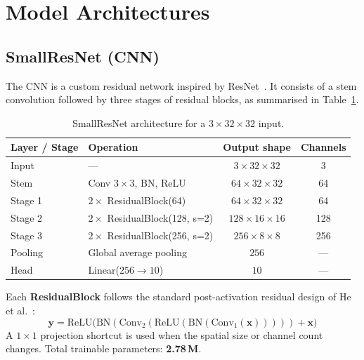 \documentclass[11pt,a4paper]{article}
\begin{document}
\section{Model Architectures}

\subsection{SmallResNet (CNN)}

The CNN is a custom residual network inspired by ResNet~\cite{he2016resnet}.
It consists of a stem convolution followed by three stages of residual blocks,
as summarised in Table~\ref{tab:cnn_arch}.

\begin{table}[H]
\centering
\caption{SmallResNet architecture for a $3\times32\times32$ input.}
\label{tab:cnn_arch}
\begin{tabular}{llcc}
\toprule
\textbf{Layer / Stage} & \textbf{Operation} & \textbf{Output shape} & \textbf{Channels} \\
\midrule
Input  & ---                              & $3\times32\times32$   & 3   \\
Stem   & Conv $3\times3$, BN, ReLU        & $64\times32\times32$  & 64  \\
Stage 1 & $2\times$ ResidualBlock(64)     & $64\times32\times32$  & 64  \\
Stage 2 & $2\times$ ResidualBlock(128, s=2)& $128\times16\times16$& 128 \\
Stage 3 & $2\times$ ResidualBlock(256, s=2)& $256\times8\times8$  & 256 \\
Pooling & Global average pooling          & $256$                 & --- \\
Head   & Linear($256 \to 10$)             & $10$                  & --- \\
\bottomrule
\end{tabular}
\end{table}

Each \textbf{ResidualBlock} follows the standard post-activation residual design of He et al.~\cite{he2016resnet}:
\[
\mathbf{y} = \text{ReLU}\bigl(\text{BN}(\text{Conv}_2(\text{ReLU}(\text{BN}(\text{Conv}_1(\mathbf{x}))))) + \mathbf{x}\bigr)
\]
A $1\times1$ projection shortcut is used when the spatial size or channel count changes.
Total trainable parameters: \textbf{2.78\,M}.
\end{document}
